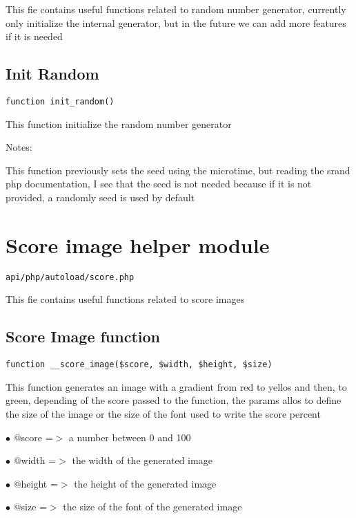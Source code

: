 \documentclass[a4paper]{book}
\begin{document}
This fie contains useful functions related to random number generator, currently only initialize
the internal generator, but in the future we can add more features if it is needed

\hypertarget{toc227}{}
\subsection{Init Random}

\begin{lstlisting}
function init_random()
\end{lstlisting}

This function initialize the random number generator

Notes:

This function previously sets the seed using the microtime, but reading
the srand php documentation, I see that the seed is not needed because
if it is not provided, a randomly seed is used by default

\hypertarget{toc228}{}
\section{Score image helper module}

\begin{lstlisting}
api/php/autoload/score.php
\end{lstlisting}

This fie contains useful functions related to score images

\hypertarget{toc229}{}
\subsection{Score Image function}

\begin{lstlisting}
function __score_image($score, $width, $height, $size)
\end{lstlisting}

This function generates an image with a gradient from red to yellos and
then, to green, depending of the score passed to the function, the params
allos to define the size of the image or the size of the font used to
write the score percent

\begin{compactitem}
\item[\color{myblue}$\bullet$] @score  =$>$ a number between 0 and 100
\item[\color{myblue}$\bullet$] @width  =$>$ the width of the generated image
\item[\color{myblue}$\bullet$] @height =$>$ the height of the generated image
\item[\color{myblue}$\bullet$] @size   =$>$ the size of the font of the generated image
\end{compactitem}
\end{document}
